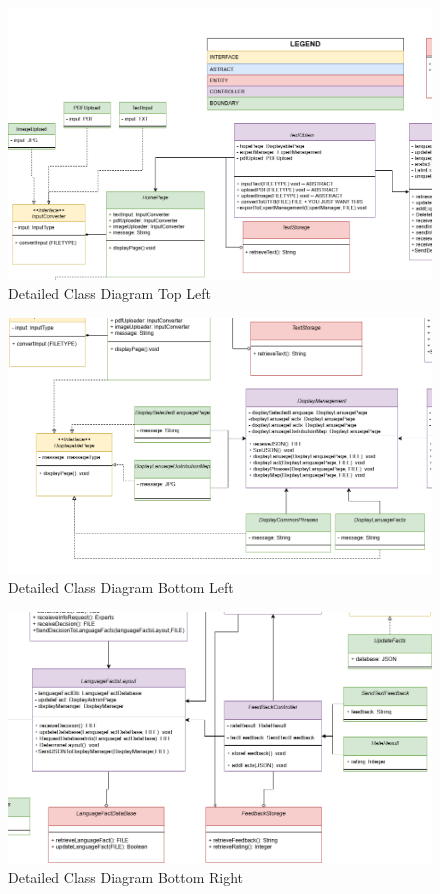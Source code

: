 \begin{figure}[H]
	\centering
	\includegraphics[width=\textwidth, height=\textheight, keepaspectratio]{Section4/images/LangufiyClassDiagramV6TL.png}
	\caption{Detailed Class Diagram Top Left}
	\label{DetailedClassDiagramQ2}
\end{figure}

\begin{figure}[H]
	\centering
	\includegraphics[width=\textwidth, height=\textheight, keepaspectratio]{Section4/images/LangufiyClassDiagramV8BL.png}
	\caption{Detailed Class Diagram Bottom Left}
	\label{DetailedClassDiagramQ3}
\end{figure}

\begin{figure}[H]
	\centering
	\includegraphics[width=\textwidth, height=\textheight, keepaspectratio]{Section4/images/LangufiyClassDiagramV7BR.png}
	\caption{Detailed Class Diagram Bottom Right}
	\label{DetailedClassDiagramQ4}
\end{figure}